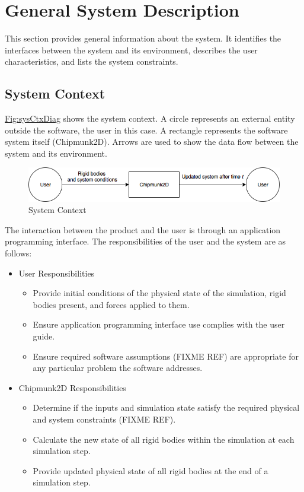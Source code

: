 \documentclass[12pt]{article}
\begin{document}
\section{General System Description}
\label{Sec:GenSysDesc}
This section provides general information about the system. It identifies the interfaces between the system and its environment, describes the user characteristics, and lists the system constraints.
\subsection{System Context}
\label{Sec:SysContext}
\hyperref[Figure:sysCtxDiag]{Fig:sysCtxDiag} shows the system context. A circle represents an external entity outside the software, the user in this case. A rectangle represents the software system itself (Chipmunk2D). Arrows are used to show the data flow between the system and its environment.
\begin{figure}
\begin{center}
\includegraphics[width=\textwidth]{../../../datafiles/GamePhysics/sysctx.png}
\caption{System Context}
\label{Figure:sysCtxDiag}
\end{center}
\end{figure}
The interaction between the product and the user is through an application programming interface. The responsibilities of the user and the system are as follows:
\begin{itemize}
\item{User Responsibilities}
\begin{itemize}
\item{Provide initial conditions of the physical state of the simulation, rigid bodies present, and forces applied to them.}
\item{Ensure application programming interface use complies with the user guide.}
\item{Ensure required software assumptions (FIXME REF) are appropriate for any particular problem the software addresses.}
\end{itemize}
\item{Chipmunk2D Responsibilities}
\begin{itemize}
\item{Determine if the inputs and simulation state satisfy the required physical and system constraints (FIXME REF).}
\item{Calculate the new state of all rigid bodies within the simulation at each simulation step.}
\item{Provide updated physical state of all rigid bodies at the end of a simulation step.}
\end{itemize}
\end{itemize}
\end{document}
